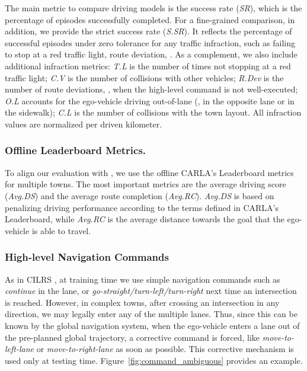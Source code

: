 The main metric to compare driving models is the success rate (\emph{SR}), which is the percentage of episodes successfully completed. 
For a fine-grained comparison, in addition, we provide the strict success rate (\emph{S.SR}). 
It reflects the percentage of successful episodes under zero tolerance for any traffic infraction, such as failing to stop at a red traffic light, route deviation, {\etc}. 
As a complement, we also include additional infraction metrics: \emph{T.L} is the number of times not stopping at a red traffic light; 
\emph{C.V} is the number of collisions with other vehicles; 
\emph{R.Dev} is the number of route deviations, {\ie}, when the high-level command is not well-executed; 
\emph{O.L} accounts for the ego-vehicle driving out-of-lane ({\eg}, in the opposite lane or in the sidewalk); 
\emph{C.L} is the number of collisions with the town layout. 
All infraction values are normalized per driven kilometer.


\subsubsection{Offline Leaderboard Metrics.}\label{lb_metrics}
To align our evaluation with \cite{Hu:2022}, we use the offline CARLA's Leaderboard metrics for multiple towns. 
The most important metrics are the average driving score (\emph{Avg.DS}) and the average route completion (\emph{Avg.RC}). 
\emph{Avg.DS} is based on penalizing driving performance according to the terms defined in CARLA's Leaderboard, 
while \emph{Avg.RC} is the average distance towards the goal that the ego-vehicle is able to travel.


\subsubsection{High-level Navigation Commands} 
As in CILRS \cite{Codevilla:2019}, at training time we use simple navigation commands such as \emph{continue} in the lane, or \emph{go-straight/turn-left/turn-right} next time an intersection is reached. 
However, in complex towns, after crossing an intersection in any direction, we may legally enter any of the multiple lanes. 
Thus, since this can be known by the global navigation system, when the ego-vehicle enters a lane out of the pre-planned global trajectory, a corrective command is forced, like \emph{move-to-left-lane} or  \emph{move-to-right-lane} as soon as possible. 
This corrective mechanism is used only at testing time. 
Figure~\ref{fig:command_ambiguous} provides an example.

